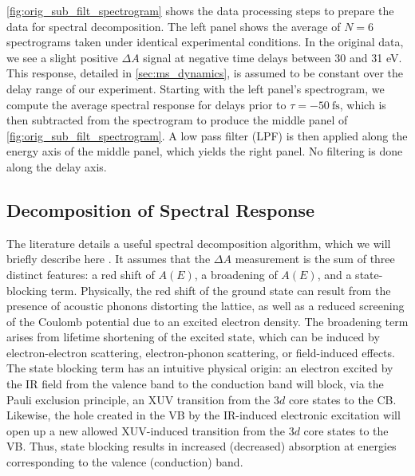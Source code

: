 \cref{fig:orig_sub_filt_spectrogram} shows the data processing steps to prepare the data for spectral decomposition. The left panel shows the average of $N=6$ spectrograms taken under identical experimental conditions. In the original data, we see a slight positive $\Delta A$ signal at negative time delays between 30 and 31 eV. This response, detailed in \cref{sec:ms_dynamics}, is assumed to be constant over the delay range of our experiment. Starting with the left panel's spectrogram, we compute the average spectral response for delays prior to $\tau = -50 \ \textrm{fs}$, which is then subtracted from the spectrogram to produce the middle panel of \cref{fig:orig_sub_filt_spectrogram}. A low pass filter (LPF) is then applied along the energy axis of the middle panel, which yields the right panel. No filtering is done along the delay axis.

\subsection{Decomposition of Spectral Response}
\label{sec:spectral_decomposition}

The literature details a useful spectral decomposition algorithm, which we will briefly describe here \cite{zurchDirectSimultaneousObservation2017}. It assumes that the $\Delta A$ measurement is the sum of three distinct features: a red shift of $A(E)$, a broadening of $A(E)$, and a state-blocking term. Physically, the red shift of the ground state can result from the presence of acoustic phonons distorting the lattice, as well as a reduced screening of the Coulomb potential due to an excited electron density. The broadening term arises from lifetime shortening of the excited state, which can be induced by electron-electron scattering, electron-phonon scattering, or field-induced effects. The state blocking term has an intuitive physical origin: an electron excited by the IR field from the valence band to the conduction band will block, via the Pauli exclusion principle, an XUV transition from the $3d$ core states to the CB. Likewise, the hole created in the VB by the IR-induced electronic excitation will open up a new allowed XUV-induced transition from the $3d$ core states to the VB. Thus, state blocking results in increased (decreased) absorption at energies corresponding to the valence (conduction) band.

